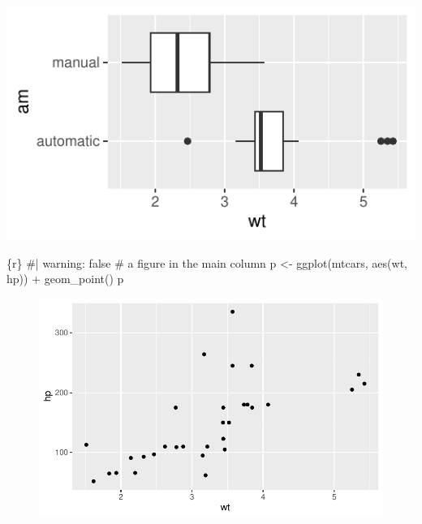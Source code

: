 \documentclass[
  letterpaper,
  DIV=11,
  numbers=noendperiod,
  oneside]{scrartcl}
\newenvironment{Shaded}{\begin{snugshade}}{\end{snugshade}}
\newcommand{\CommentTok}[1]{\textcolor[rgb]{0.37,0.37,0.37}{#1}}
\newcommand{\FunctionTok}[1]{\textcolor[rgb]{0.28,0.35,0.67}{#1}}
\newcommand{\InformationTok}[1]{\textcolor[rgb]{0.37,0.37,0.37}{#1}}
\newcommand{\NormalTok}[1]{\textcolor[rgb]{0.00,0.23,0.31}{#1}}
\newcommand{\OtherTok}[1]{\textcolor[rgb]{0.00,0.23,0.31}{#1}}
\newcommand{\SpecialCharTok}[1]{\textcolor[rgb]{0.37,0.37,0.37}{#1}}
\begin{document}
\begin{marginfigure}

{\centering \includegraphics{HousePrices_files/figure-pdf/unnamed-chunk-11-1.pdf}

}

\end{marginfigure}

\begin{Shaded}
\begin{Highlighting}[]
\InformationTok{\textasciigrave{}\textasciigrave{}\textasciigrave{}\{r\}}
\CommentTok{\#| warning: false}
\CommentTok{\# a figure in the main column}
\NormalTok{p }\OtherTok{\textless{}{-}} \FunctionTok{ggplot}\NormalTok{(mtcars, }\FunctionTok{aes}\NormalTok{(wt, hp)) }\SpecialCharTok{+} \FunctionTok{geom\_point}\NormalTok{()}
\NormalTok{p}
\InformationTok{\textasciigrave{}\textasciigrave{}\textasciigrave{}}
\end{Highlighting}
\end{Shaded}

\begin{figure}[H]

{\centering \includegraphics{HousePrices_files/figure-pdf/unnamed-chunk-12-1.pdf}

}

\end{figure}
\end{document}
